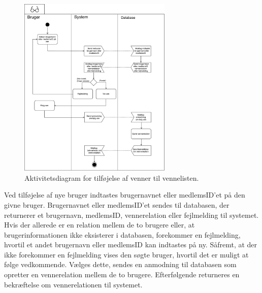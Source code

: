 \begin{figure} [H]
\centering
\includegraphics[width=0.65\textwidth]{figures/aktivitetsdiagram/foelgnyven}
\caption{Aktivitetsdiagram for tilføjelse af venner til vennelisten.}
\label{fig:tilfoejven}
\end{figure}

Ved tilføjelse af nye bruger indtastes brugernavnet eller medlemsID'et på den givne bruger. Brugernavnet eller medlemsID'et sendes til databasen, der returnerer et brugernavn, medlemsID, vennerelation eller fejlmelding til systemet. Hvis der allerede er en relation mellem de to brugere eller, at brugerinformationen ikke eksisterer i databasen, forekommer en fejlmelding, hvortil et andet brugernavn eller medlemsID kan indtastes på ny. 
Såfremt, at der ikke forekommer en fejlmelding vises den søgte bruger, hvortil det er muligt at følge vedkommende. 
Vælges dette, sendes en anmodning til databasen som opretter en vennerelation mellem de to brugere. Efterfølgende returneres en bekræftelse om vennerelationen til systemet.